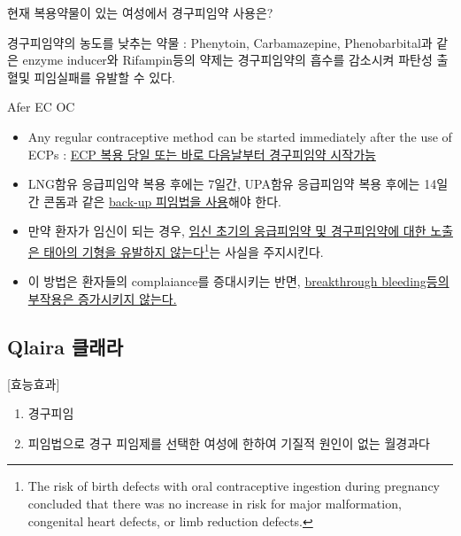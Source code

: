현재 복용약물이 있는 여성에서 경구피임약 사용은?
\begin{quotebox}
경구피임약의 농도를 낮추는 약물 : Phenytoin, Carbamazepine, Phenobarbital과 같은 enzyme inducer와 Rifampin등의 약제는 경구피임약의 흡수를 감소시켜 파탄성 출혈및 피임실패를 유발할 수 있다.
\end{quotebox}
\begin{commentbox}{Afer EC OC}
\begin{itemize}\tightlist
\item Any regular contraceptive method can be started immediately after the use of ECPs :  \uline{ECP 복용 당일 또는 바로 다음날부터 경구피임약 시작가능}
\item LNG함유 응급피임약 복용 후에는 7일간, UPA함유 응급피임약 복용 후에는 14일간 콘돔과 같은  \uline{back-up 피임법을 사용}해야 한다.
\item 만약 환자가 임신이 되는 경우,  \uline{임신 초기의 응급피임약 및 경구피임약에 대한 노출은 태아의 기형을 유발하지 않는다}\footnote{The risk of birth defects with oral contraceptive ingestion during pregnancy concluded that there was no increase in risk for major malformation, congenital heart defects, or limb reduction defects.}는 사실을 주지시킨다.
\item 이 방법은 환자들의 complaiance를 증대시키는 반면, \uline{breakthrough bleeding등의 부작용은 증가시키지 않는다.}
\end{itemize}
\end{commentbox}

\subsection{Qlaira 클래라}
{[효능효과]
\begin{enumerate}[1.]\tightlist
\item 경구피임
\item 피임법으로 경구 피임제를 선택한 여성에 한하여 기질적 원인이 없는 월경과다
\end{enumerate}
}

